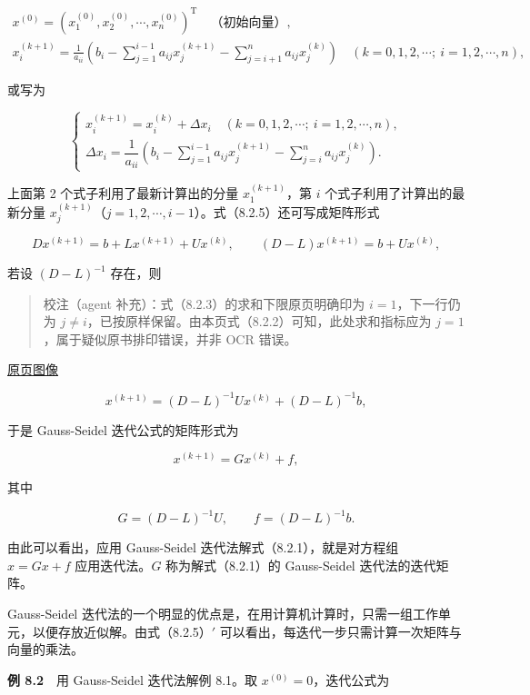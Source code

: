 \documentclass[
  10pt,
  fontset=fandol]{ctexart}
\begin{document}
\[
\begin{gathered}
x^{(0)}=(x_1^{(0)},x_2^{(0)},\cdots,x_n^{(0)})^{\mathrm T}\quad\text{（初始向量）},\\[4pt]
x_i^{(k+1)}=\frac1{a_{ii}}\left(b_i-\sum_{j=1}^{i-1}a_{ij}x_j^{(k+1)}-\sum_{j=i+1}^{n}a_{ij}x_j^{(k)}\right)\quad(k=0,1,2,\cdots;\ i=1,2,\cdots,n),
\end{gathered}
\tag{8.2.5}
\]

或写为

\[
\begin{cases}
x_i^{(k+1)}=x_i^{(k)}+\Delta x_i\quad(k=0,1,2,\cdots;\ i=1,2,\cdots,n),\\[4pt]
\Delta x_i=\dfrac1{a_{ii}}\left(b_i-\displaystyle\sum_{j=1}^{i-1}a_{ij}x_j^{(k+1)}-\displaystyle\sum_{j=i}^{n}a_{ij}x_j^{(k)}\right).
\end{cases}
\tag{8.2.5'}
\]

上面第 2 个式子利用了最新计算出的分量 \(x_1^{(k+1)}\)，第 \(i\) 个式子利用了计算出的最新分量 \(x_j^{(k+1)}\)（\(j=1,2,\cdots,i-1\)）。式（8.2.5）还可写成矩阵形式

\[
Dx^{(k+1)}=b+Lx^{(k+1)}+Ux^{(k)},\qquad(D-L)x^{(k+1)}=b+Ux^{(k)},
\]

若设 \((D-L)^{-1}\) 存在，则

\begin{quote}
校注（agent 补充）：式（8.2.3）的求和下限原页明确印为 \(i=1\)，下一行仍为 \(j\neq i\)，已按原样保留。由本页式（8.2.2）可知，此处求和指标应为 \(j=1\)，属于疑似原书排印错误，并非 OCR 错误。
\end{quote}

\href{../../source-images/pdf-219.jpeg}{原页图像}

\[
x^{(k+1)}=(D-L)^{-1}Ux^{(k)}+(D-L)^{-1}b,
\]

于是 Gauss-Seidel 迭代公式的矩阵形式为

\[
x^{(k+1)}=Gx^{(k)}+f,
\tag{8.2.6}
\]

其中

\[
G=(D-L)^{-1}U,\qquad f=(D-L)^{-1}b.
\]

由此可以看出，应用 Gauss-Seidel 迭代法解式（8.2.1），就是对方程组 \(x=Gx+f\) 应用迭代法。\(G\) 称为解式（8.2.1）的 Gauss-Seidel 迭代法的迭代矩阵。

Gauss-Seidel 迭代法的一个明显的优点是，在用计算机计算时，只需一组工作单元，以便存放近似解。由式（8.2.5）\('\) 可以看出，每迭代一步只需计算一次矩阵与向量的乘法。

\textbf{例 8.2}　用 Gauss-Seidel 迭代法解例 8.1。取 \(x^{(0)}=0\)，迭代公式为
\end{document}
